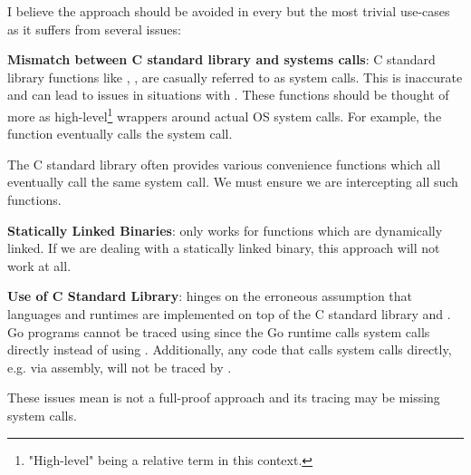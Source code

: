 I believe the \ldpreload{} approach should be avoided in every but the most trivial use-cases as it suffers from several issues:
\begin{compactitem}
    \item \textbf{Mismatch between C standard library and systems calls}: C standard library functions like , ,  are casually referred to as system calls. This is inaccurate and can lead to issues in situations with \ldpreload{}. These functions should be thought of more as high-level\footnote{"High-level" being a relative term in this context.} wrappers around actual OS system calls. For example, the  function eventually calls the  system call.
    
    The C standard library often provides various convenience functions which all eventually call the same system call. We must ensure we are intercepting all such functions.
    \item \textbf{Statically Linked Binaries}: \ldpreload{} only works for functions which are
    dynamically linked. If we are dealing with a statically linked binary, this approach will not work at all.
    \item \textbf{Use of C Standard Library}: \ldpreload{} hinges on the erroneous assumption that languages and runtimes are implemented on top of the C standard library and . Go programs cannot be traced using \ldpreload{} since the Go runtime calls system calls directly instead of using . Additionally, any code that calls system calls directly, e.g. via assembly, will not be traced by \ldpreload.
\end{compactitem}

These issues mean \ldpreload{} is not a full-proof approach and its tracing may be missing system calls.

